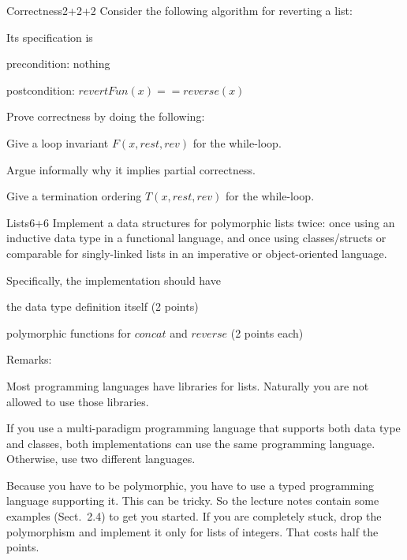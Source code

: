 \documentclass[a4paper]{article}
\begin{document}
\header

\begin{problem}{Correctness}{2+2+2}
Consider the following algorithm for reverting a list:
\begin{acode}
\end{acode}

Its specification is
\begin{compactitem}
 \item precondition: nothing
 \item postcondition: $revertFun(x)==reverse(x)$
\end{compactitem}

Prove correctness by doing the following:
\begin{compactenum}
 \item Give a loop invariant $F(x,rest,rev)$ for the while-loop.
 \item Argue informally why it implies partial correctness. 
 \item Give a termination ordering $T(x,rest,rev)$ for the while-loop.
\end{compactenum}
\end{problem}

\begin{problem}{Lists}{6+6}
Implement a data structures for polymorphic lists twice: once using an inductive data type in a functional language, and once using classes/structs or comparable for singly-linked lists in an imperative or object-oriented language.

Specifically, the implementation should have
\begin{compactitem}
 \item the data type definition itself (2 points)
 \item polymorphic functions for $concat$ and $reverse$ (2 points each)
\end{compactitem}

Remarks:
\begin{compactitem}
\item Most programming languages have libraries for lists.
Naturally you are not allowed to use those libraries.
\item If you use a multi-paradigm programming language that supports both data type and classes, both implementations can use the same programming language.
Otherwise, use two different languages.
\item Because you have to be polymorphic, you have to use a typed programming language supporting it.
This can be tricky. So the lecture notes contain some examples (Sect.~2.4) to get you started.
If you are completely stuck, drop the polymorphism and implement it only for lists of integers.
That costs half the points.
\end{compactitem}
\end{problem}
\end{document}
